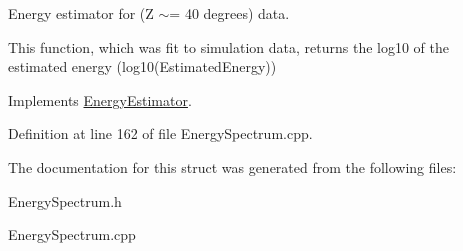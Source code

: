 Energy estimator for (Z $\sim$= 40 degrees) data. 

This function, which was fit to simulation data, returns the log10 of the estimated energy (log10(EstimatedEnergy)) 

Implements \hyperlink{structEnergyEstimator}{EnergyEstimator}.



Definition at line 162 of file EnergySpectrum.cpp.



The documentation for this struct was generated from the following files:\begin{DoxyCompactItemize}
\item 
EnergySpectrum.h\item 
EnergySpectrum.cpp\end{DoxyCompactItemize}
